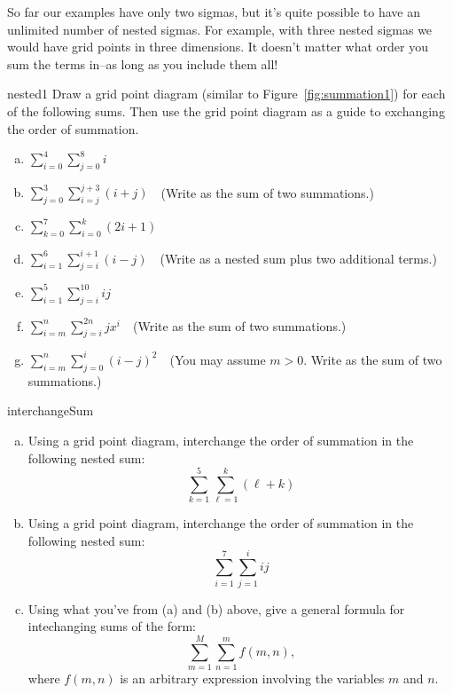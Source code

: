 So far our examples have only two sigmas, but it's quite possible to have an unlimited number of nested sigmas. For example, with three nested sigmas we would have grid points in three dimensions.  It doesn't matter what order you sum the terms in--as long as you include them all!

\begin{exercise}{nested1}
Draw a grid point diagram (similar to Figure~\ref{fig:summation1}) for each of the following sums.  Then use the grid point diagram  as a guide to exchanging the order of summation.
\begin{enumerate}[(a)]
\item
$\displaystyle{\sum_{i=0}^{4}\sum_{j=0}^{8}i}$
\item
$\displaystyle{\sum_{j=0}^{3} \sum_{i=j}^{j+3} (i+j)}$~~(Write as the sum of two summations.)
\item
$\displaystyle{\sum_{k=0}^{7}\sum_{i=0}^{k}(2i+1) }$
\item
$\displaystyle{\sum_{i=1}^{6}\sum_{j=i}^{i+1} (i-j) }$~~(Write as a nested sum plus two additional terms.)
\item
$\displaystyle{\sum_{i=1}^{5}\sum_{j=i}^{10} ij }$
\item
$\displaystyle{\sum_{i=m}^{n}\sum_{j=i}^{2n}jx^i }$~~(Write as the sum of two summations.)
\item
$\displaystyle{\sum_{i=m}^{n}\sum_{j=0}^{i}(i-j)^2 }$~~(You may assume $m>0$.  Write as the sum of two summations.)
\end {enumerate}
\end{exercise}

\begin{exercise}{interchangeSum}
\begin{enumerate}[(a)]
\item
Using a grid point diagram, interchange the order of summation in the following nested sum:
\[
\sum_{k=1}^{5} \sum_{\ell=1}^k (\ell + k)
\]
\item
Using a grid point diagram, interchange the order of summation in the following nested sum:
\[
\sum_{i=1}^{7} \sum_{j=1}^i ij
\]
\item
Using what you've from (a) and (b) above, give a general formula for intechanging sums of the form:
\[
\sum_{m=1}^M \sum_{n=1}^m f(m,n),
\]
where $f(m,n)$ is an arbitrary expression involving the variables $m$ and $n$.
\end{enumerate}
\end{exercise}

